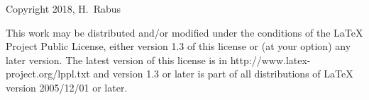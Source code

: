 \documentclass[smallheadings]{scrartcl}
\begin{document}
\itshape{Copyright 2018, H.\ Rabus

This work may be distributed and/or modified under the
conditions of the LaTeX Project Public License, either version 1.3
of this license or (at your option) any later version.
The latest version of this license is in
  http://www.latex-project.org/lppl.txt
and version 1.3 or later is part of all distributions of LaTeX
version 2005/12/01 or later.
}


\end{document}
